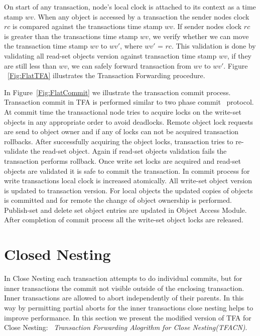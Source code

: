 \documentclass[12pt,english]{report}
\begin{document}
On start of any transaction, node's local clock is attached to its context as a time stamp $wv$. When any object is accessed by a transaction the sender nodes clock $rc$ is compared against the transactions time stamp $wv$. If sender nodes clock $rc$ is greater than the transactions time stamp $wv$, we verify whether we can move the transaction time stamp $wv$ to $wv'$, where $wv'$ = $rc$. This validation is done by validating all read-set objects version against transaction time stamp $wv$, if they are still less than $wv$, we can safely forward transaction from $wv$ to $wv'$. Figure ~\ref{Fig:FlatTFA} illustrates the Transaction Forwarding procedure.

In Figure~\ref{Fig:FlatCommit} we illustrate the transaction commit process. Transaction commit in TFA is performed similar to two phase commit~\cite{TwoPC:weikum1991principles} protocol. At commit time the transactional node tries to acquire locks on the write-set objects in any appropriate order to avoid deadlocks. Remote object lock requests are send to object owner and if any of locks can not be acquired transaction rollbacks. After successfully acquiring the object locks, transaction tries to re-validate the read-set object. Again if read-set objects validation fails the transaction performs rollback. Once write set locks are acquired and read-set objects are validated it is safe to commit the transaction. In commit process for write transactions local clock is increased atomically. All write-set object version is updated to transaction version. For local objects the updated copies of objects is committed and for remote the change of object ownership is performed. Publish-set and delete set object entries are updated in Object Access Module. After completion of commit process all the write-set object locks are released. 
   
\section{Closed Nesting} 

In Close Nesting each transaction attempts to do individual commits, but for inner transactions the commit not visible outside of the enclosing transaction. Inner transactions are allowed to abort independently of their parents. In this way by permitting partial aborts for the inner transactions close nesting helps to improve performance. In this section we present the modified version of TFA for Close Nesting: ~\emph{Transaction Forwarding Alogrithm for Close Nesting(TFACN)}.
\end{document}
